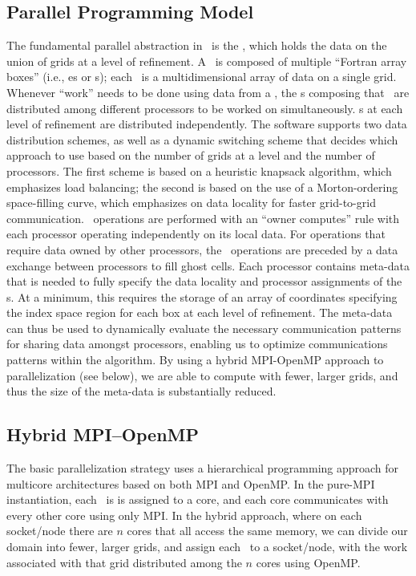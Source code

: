 \subsection{Parallel Programming Model}

The fundamental parallel abstraction in \BoxLib\ is the \MultiFab, which holds the data on the 
union of grids at a level of refinement.  A \MultiFab\ is composed of multiple ``Fortran array boxes''
(i.e., \FArrayBox es or \Fab s); each \Fab\ is a multidimensional array of data on a single grid. 
Whenever ``work'' needs to be done using data from a \MultiFab, the 
\Fab s composing that \MultiFab\ are distributed among different processors 
to be worked on simultaneously.  \Fab s at each level of refinement are distributed 
independently.  The software supports two data distribution schemes, as well as a 
dynamic switching scheme that decides which approach to use based on the number of 
grids at a level and the number of processors.  The first scheme is based on a 
heuristic knapsack algorithm, which emphasizes load balancing; the second is based on 
the use of a Morton-ordering space-filling curve, which emphasizes on data locality for
faster grid-to-grid communication. 
\MultiFab\ operations are performed with an ``owner computes'' rule 
with each processor operating independently on its local data.  For operations that 
require data owned by other processors, the \MultiFab\ operations are preceded by a 
data exchange between processors to fill ghost cells.  Each processor contains 
meta-data that is needed 
to fully specify the data locality and processor assignments of the \Fab s. At a 
minimum, this requires the storage of an array of coordinates specifying the index space 
region for each box at each level of refinement.  The meta-data can thus be used to 
dynamically evaluate the necessary communication patterns for sharing data amongst 
processors, enabling us to optimize communications patterns within the algorithm.
By using a hybrid MPI-OpenMP approach to parallelization (see below), we are able to 
compute with fewer, larger grids, and thus the size of the meta-data is substantially 
reduced.

\subsection{Hybrid MPI--OpenMP}

The basic parallelization strategy uses a hierarchical programming approach for 
multicore architectures based on both MPI and OpenMP.  In the pure-MPI instantiation, 
each \Fab\ is is assigned to a core, and each core communicates 
with every other core using only MPI.  In the hybrid approach, where on each socket/node 
there are $n$ cores that all access the same memory, we can divide our domain into
fewer, larger grids, and assign each \Fab\ to a socket/node, 
with the work associated with that grid distributed among the $n$ 
cores using OpenMP.

